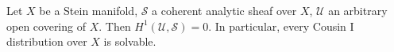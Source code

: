 Let $X$ be a Stein manifold, $\mathcal{S}$ a coherent analytic sheaf over $X$, $\mathcal{U}$ an arbitrary open covering of $X$. Then $H^1(\mathcal{U}, \mathcal{S}) = 0$. In particular, every Cousin I distribution over $X$ is solvable.
